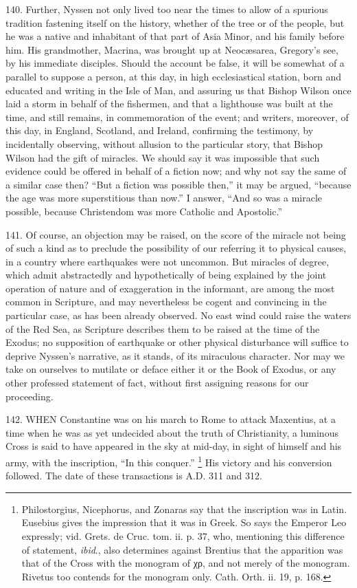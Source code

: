 140.
Further, Nyssen not only lived too near the times to allow of a
spurious tradition fastening itself on the history, whether of the
tree or of the people, but he was a native and inhabitant of that part
of Asia Minor, and his family before him. His grandmother, Macrina,
was brought up at Neocæsarea, Gregory's see, by his immediate
disciples. Should the account be false, it will be somewhat of a
parallel to suppose a person, at this day, in high ecclesiastical
station, born and educated and writing in the Isle of Man, and
assuring us that Bishop Wilson once laid a storm in behalf of the
fishermen, and that a lighthouse was built at the time, and still
remains, in commemoration of the event; and writers, moreover, of this
day, in England, Scotland, and Ireland, confirming the testimony, by
incidentally observing, without allusion to the particular story, that
Bishop Wilson had the gift of miracles. We should say it was
impossible that such evidence could be offered in behalf of a fiction
now; and why not say the same of a similar case then? ``But a fiction
was possible then,'' it may be argued, ``because the age was more
superstitious than now.'' I answer, ``And so was a miracle possible,
because Christendom was more Catholic and Apostolic.''

141.
Of course, an objection may be raised, on the score of the miracle not
being of such a kind as to preclude the possibility of our referring
it to physical causes, in a country where earthquakes were not
uncommon. But miracles of degree, which admit abstractedly and
hypothetically of being explained by the joint operation of nature and
of exaggeration in the informant, are among the most common in
Scripture, and may nevertheless be cogent and convincing in the
particular case, as has been already observed. No east wind could
raise the waters of the Red Sea, as Scripture describes them to be
raised at the time of the Exodus; no supposition of earthquake or other physical disturbance will suffice to deprive Nyssen's
narrative, as it stands, of its miraculous character. Nor may we take
on ourselves to mutilate or deface either it or the Book of Exodus, or
any other professed statement of fact, without first assigning reasons
for our proceeding.


142.
WHEN Constantine was on his
march to Rome to attack Maxentius, at a time when he was as yet
undecided about the truth of Christianity, a luminous Cross is said to
have appeared in the sky at mid-day, in sight of himself and his army,
with the inscription, ``In this conquer.'' \footnote{Philostorgius, Nicephorus, and Zonaras say
that the inscription was in Latin. Eusebius gives the impression that
it was in Greek. So says the Emperor Leo expressly; vid. Grets. de
Cruc. tom. ii. p. 37, who, mentioning this difference of statement, \emph{ibid}.,
also determines against Brentius that the apparition was that of the
Cross with the monogram of χρ, and not merely of the
monogram. Rivetus too contends for the monogram only. Cath. Orth. ii.
19, p. 168.} His victory and his conversion followed. The date of these
transactions is A.D. 311 and
312.

